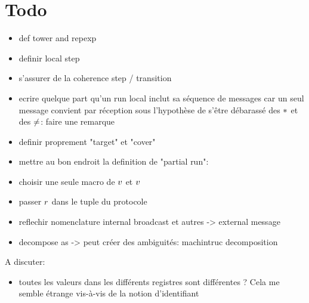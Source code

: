 \section{Todo}

\begin{itemize}
\item def tower and repexp
\item definir local step
\item s'assurer de la coherence step / transition
\item ecrire quelque part qu'un run local inclut sa séquence de messages car un seul message convient par réception sous l'hypothèse de s'être débarassé des ${*}$ et des ${\ne}$: faire une remarque \label{rem:local_transition_unique_message}
\item definir proprement "target" et "cover"
\item mettre au bon endroit la definition de "partial run": 
    \item choisir une seule macro de $v$ et $v$
    \item passer $r$ dans le tuple du protocole
    \item reflechir nomenclature internal broadcast et autres -> external message
    \item decompose as -> peut créer des ambiguités: machintruc decomposition 
\end{itemize}

A discuter:
\begin{itemize}
\item toutes les valeurs dans les différents registres sont différentes ? Cela me semble étrange vis-à-vis de la notion d'identifiant


\end{itemize}